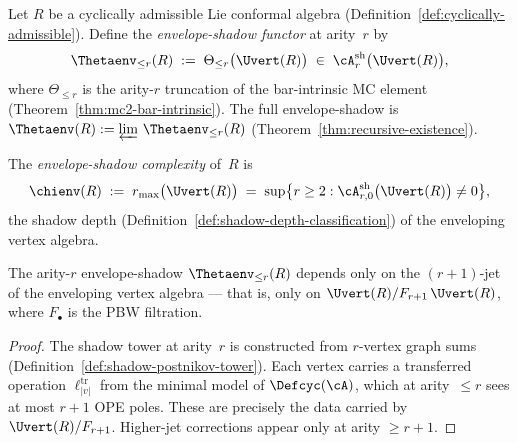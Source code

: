 \begin{definition}
\label{def:envelope-shadow-functor}
\ClaimStatusProvedHere
{}
Let $R$ be a cyclically admissible Lie conformal algebra
(Definition~\ref{def:cyclically-admissible}).
Define the \emph{envelope-shadow functor} at arity~$r$ by
\begin{equation}\label{eq:envelope-shadow-functor}
\Thetaenv_{\leq r}(R)
\;:=\;
\Theta_{\leq r}\bigl(\Uvert(R)\bigr)
\;\in\;
\cA^{\mathrm{sh}}_r\bigl(\Uvert(R)\bigr),
\end{equation}
where $\Theta_{\leq r}$ is the arity-$r$ truncation of the
bar-intrinsic MC element
(Theorem~\textup{\ref{thm:mc2-bar-intrinsic}}).
The full envelope-shadow is
$\Thetaenv(R) := \varprojlim\, \Thetaenv_{\leq r}(R)$
(Theorem~\textup{\ref{thm:recursive-existence}}).
\end{definition}

\begin{definition}
\label{def:envelope-shadow-complexity}
\ClaimStatusProvedHere
{}
The \emph{envelope-shadow complexity} of~$R$ is
\begin{equation}\label{eq:envelope-shadow-complexity}
\chienv(R)
\;:=\;
r_{\max}\bigl(\Uvert(R)\bigr)
\;=\;
\sup\bigl\{r \ge 2 :
\cA^{\mathrm{sh}}_{r,0}\bigl(\Uvert(R)\bigr) \neq 0
\bigr\},
\end{equation}
the shadow depth
(Definition~\textup{\ref{def:shadow-depth-classification}})
of the enveloping vertex algebra.
\end{definition}

\begin{proposition}
\label{prop:finite-jet-rigidity}
\ClaimStatusProvedHere
{}
The arity-$r$ envelope-shadow $\Thetaenv_{\leq r}(R)$
depends only on the $(r{+}1)$-jet of the enveloping vertex
algebra --- that is, only on
$\Uvert(R) / F_{r+1}\,\Uvert(R)$,
where $F_\bullet$ is the PBW filtration.
\end{proposition}

\begin{proof}
The shadow tower at arity~$r$ is constructed from
$r$-vertex graph sums
(Definition~\ref{def:shadow-postnikov-tower}).
Each vertex carries a transferred operation
$\ell_{|v|}^{\mathrm{tr}}$ from the minimal model of
$\Defcyc(\cA)$, which at arity~$\leq r$ sees at most
$r{+}1$ OPE poles.  These are precisely the data carried
by $\Uvert(R)/F_{r+1}$.  Higher-jet corrections appear
only at arity $\geq r{+}1$.
\end{proof}

